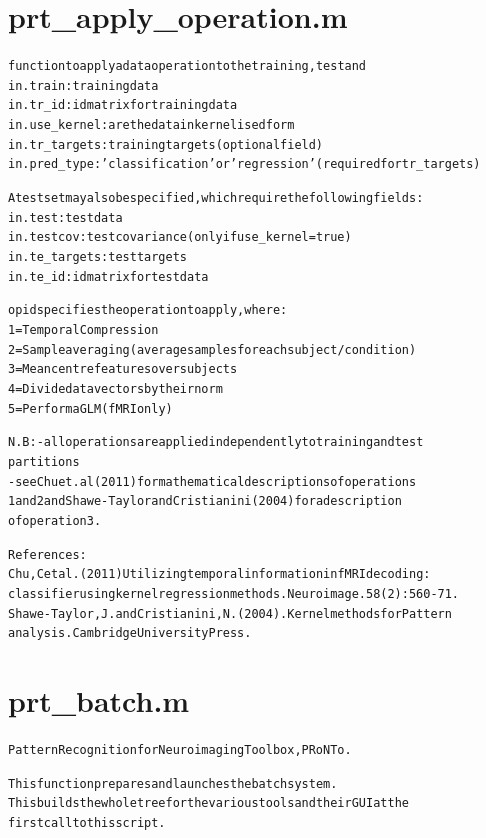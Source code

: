 \section{prt\_apply\_operation.m}
\begin{alltt}

 function to apply a data operation to the training, test and
 in.train:      training data
 in.tr\_id:      id matrix for training data
 in.use\_kernel: are the data in kernelised form
 in.tr\_targets: training targets (optional field)
 in.pred\_type:  'classification' or 'regression' (required for tr\_targets)
 
 A test set may also be specified, which require the following fields:
 in.test:       test data
 in.testcov:    test covariance (only if use\_kernel = true)
 in.te\_targets: test targets
 in.te\_id:      id matrix for test data
 
 opid specifies the operation to apply, where:
    1 = Temporal Compression
    2 = Sample averaging (average samples for each subject/condition)
    3 = Mean centre features over subjects
    4 = Divide data vectors by their norm
    5 = Perform a GLM (fMRI only)
 
 N.B: - all operations are applied independently to training and test
        partitions
      - see Chu et. al (2011) for mathematical descriptions of operations
        1 and 2 and Shawe-Taylor and Cristianini (2004) for a description
        of operation 3.
 
 References:
 Chu, C et al. (2011) Utilizing temporal information in fMRI decoding:
 classifier using kernel regression methods. Neuroimage. 58(2):560-71.
 Shawe-Taylor, J. and Cristianini, N. (2004). Kernel methods for Pattern
 analysis. Cambridge University Press.
\end{alltt}


\section{prt\_batch.m}
\begin{alltt}

 Pattern Recognition for Neuroimaging Toolbox, PRoNTo.
 
 This function prepares and launches the batch system.
 This builds the whole tree for the various tools and their GUI at the
 first call to this script.
\end{alltt}


